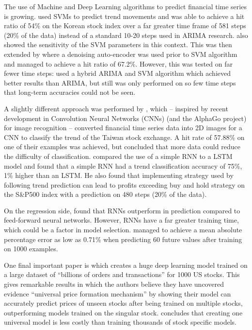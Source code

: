 \documentclass[11pt,a4paper]{article}
\numberwithin{equation}{section}
\begin{document}
The use of Machine and Deep Learning algorithms to predict financial time series is growing. \cite{kim2003} used SVMs to predict trend movements and was able to achieve a hit ratio of 54\% on the Korean stock index over a far greater time frame of 581 steps (20\% of the data) instead of a standard 10-20 steps used in ARIMA research. \cite{kim2003} also showed the sensitivity of the SVM parameters in this context. This was then extended by \cite{qian2017} where a denoising auto-encoder was used prior to SVM algorithm and managed to achieve a hit ratio of 67.2\%. However, this was tested on far fewer time steps: \cite{pai2005} used a hybrid ARIMA and SVM algorithm which achieved better results than ARIMA, but still was only performed on so few time steps that long-term accuracies could not be seen.

A slightly different approach was performed by \cite{chen2016}, which – inspired by recent development in Convolution Neural Networks (CNNs) (and the AlphaGo project) for image recognition – converted financial time series data into 2D images for a CNN to classify the trend of the Taiwan stock exchange. A hit rate of 57.88\% on one of their examples was achieved, but concluded that more data could reduce the difficulty of classification. \cite{edet} compared the use of a simple RNN to a LSTM model and found that a simple RNN had a trend classification accuracy of 75\%, 1\% higher than an LSTM. He also found that implementing strategy used by following trend prediction can lead to profits exceeding buy and hold strategy on the S\&P500 index with a prediction on 480 steps (20\% of the data).

On the regression side, \cite{iqbal2013} found that RNNs outperform in prediction compared to feed-forward neural networks. However, RNNs have a far greater training time, which could be a factor in model selection. \cite{wan2014} managed to achieve a mean absolute percentage error as low as 0.71\% when predicting 60 future values after training on 1000 examples.

One final important paper is \cite{siri2018} which creates a huge deep learning model trained on a large dataset of “billions of orders and transactions” \cite{siri2018} for 1000 US stocks. This gives remarkable results in which the authors believe they have uncovered evidence “universal price formation mechanism”\cite{siri2018} by showing their model can accurately predict prices of unseen stocks after being trained on multiple stocks, outperforming models trained on the singular stock. \cite{siri2018} concludes that creating one universal model is less costly than training thousands of stock specific models.
\end{document}
